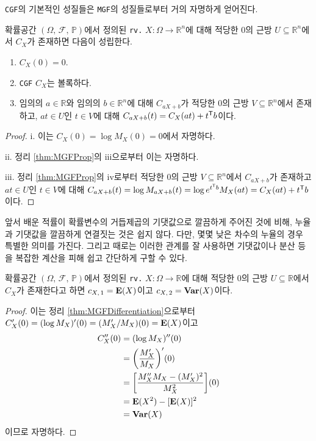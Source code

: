 \texttt{CGF}의 기본적인 성질들은 \texttt{MGF}의 성질들로부터 거의 자명하게 얻어진다.

\begin{theorem}\label{thm:CGFProp}
    확률공간 $(\Omega,\,\mathcal{F},\,\mathbb{P})$에서 정의된 \texttt{rv.} $X:\Omega\to\mathbb{R}^n$에 대해 적당한 $0$의 근방 $U\subseteq\mathbb{R}^n$에서 $C_X$가 존재하면 다음이 성립한다.
    \begin{enumerate}
        \item $C_X(0)=0$.
        \item \texttt{CGF} $C_X$는 볼록하다.
        \item 임의의 $a\in\mathbb{R}$와 임의의 $b\in\mathbb{R}^n$에 대해 $C_{aX+b}$가 적당한 $0$의 근방 $V\subseteq\mathbb{R}^n$에서 존재하고, $at\in U$인 $t\in V$에 대해 $C_{aX+b}(t)=C_X(at)+t^{\mathsf{T}} b$이다.
    \end{enumerate}
\end{theorem}

\begin{proof}
    i. 이는 $C_X(0)=\log M_X(0)=0$에서 자명하다.

    ii. 정리 \ref{thm:MGFProp}의 iii으로부터 이는 자명하다.

    iii. 정리 \ref{thm:MGFProp}의 iv로부터 적당한 $0$의 근방 $V\subseteq\mathbb{R}^n$에서 $C_{aX+b}$가 존재하고 $at\in U$인 $t\in V$에 대해 $C_{aX+b}(t)=\log M_{aX+b}(t)=\log e^{t^{\mathsf{T}} b}M_X(at)=C_X(at)+t^{\mathsf{T}} b$이다.
\end{proof}

앞서 배운 적률이 확률변수의 거듭제곱의 기댓값으로 깔끔하게 주어진 것에 비해, 누율과 기댓값을 깔끔하게 연결짓는 것은 쉽지 않다. 다만, 몇몇 낮은 차수의 누율의 경우 특별한 의미를 가진다. 그리고 때로는 이러한 관계를 잘 사용하면 기댓값이나 분산 등을 복잡한 계산을 피해 쉽고 간단하게 구할 수 있다.

\begin{proposition}\label{prop:firstSecondCumulant}
    확률공간 $(\Omega,\,\mathcal{F},\,\mathbb{P})$에서 정의된 \texttt{rv.} $X:\Omega\to\mathbb{R}$에 대해 적당한 $0$의 근방 $U\subseteq\mathbb{R}$에서 $C_X$가 존재한다고 하면 $c_{X,\,1}=\mathbf{E}(X)$이고 $c_{X,\,2}=\mathbf{Var}(X)$이다.
\end{proposition}

\begin{proof}
    이는 정리 \ref{thm:MGFDifferentiation}으로부터 $C_X'(0)=(\log M_X)'(0)=(M_X'/M_X)(0)=\mathbf{E}(X)$이고
    \begin{align*}
        C_X''(0)&=(\log M_X)''(0)\\
        &=\bigg(\frac{M_X'}{M_X}\bigg)'(0)\\
        &=\bigg[\frac{M_X''M_X-(M_X')^2}{M_X^2}\bigg](0)\\
        &=\mathbf{E}(X^2)-[\mathbf{E}(X)]^2\\
        &=\mathbf{Var}(X)
    \end{align*}
   이므로 자명하다.
\end{proof}

